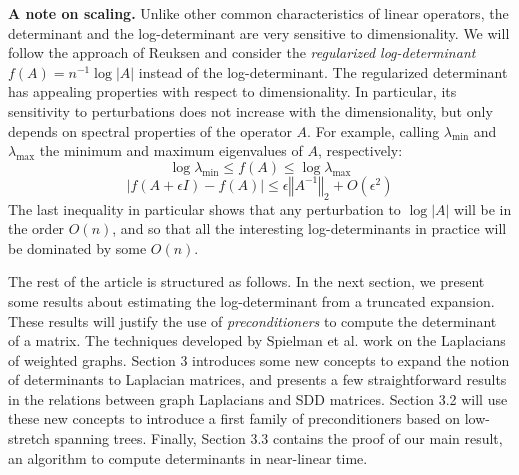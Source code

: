 \textbf{A note on scaling.} Unlike other common characteristics of
linear operators, the determinant and the log-determinant are very
sensitive to dimensionality. We will follow the approach of Reuksen
\cite{Reusken2002} and consider the \emph{regularized log-determinant}
$f\left(A\right)=n^{-1}\log\left|A\right|$ instead of the log-determinant.
The regularized determinant has appealing properties with respect
to dimensionality. In particular, its sensitivity to perturbations
does not increase with the dimensionality, but only depends on spectral
properties of the operator $A$. For example, calling $\lambda_{\min}$
and $\lambda_{\max}$ the minimum and maximum eigenvalues of $A$,
respectively: 
\[
\log\lambda_{\min}\leq f\left(A\right)\leq\log\lambda_{\max}
\]
\[
\left|f\left(A+\epsilon I\right)-f\left(A\right)\right|\leq\epsilon\left\Vert A^{-1}\right\Vert _{2}+O\left(\epsilon^{2}\right)
\]
The last inequality in particular shows that any perturbation to $\log\left|A\right|$
will be in the order $O\left(n\right)$, and so that all the interesting
log-determinants in practice will be dominated by some $O\left(n\right)$.

The rest of the article is structured as follows. In the next section,
we present some results about estimating the log-determinant from
a truncated expansion. These results will justify the use of \emph{preconditioners
}to compute the determinant of a matrix. The techniques developed
by Spielman et al. work on the Laplacians of weighted graphs. Section
3 introduces some new concepts to expand the notion of determinants
to Laplacian matrices, and presents a few straightforward results
in the relations between graph Laplacians and SDD matrices. Section
3.2 will use these new concepts to introduce a first family of preconditioners
based on low-stretch spanning trees. Finally, Section 3.3 contains
the proof of our main result, an algorithm to compute determinants
in near-linear time.
